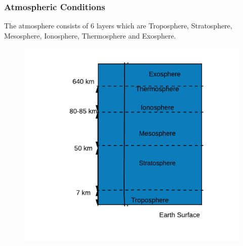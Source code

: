 \documentclass{fancyslides}
\begin{document}
\startingslide %


\begin{frame}
\end{frame}


\begin{frame}
   \frametitle{Atmospheric Conditions}
The atmosphere consists of 6 layers which are Troposphere, Stratosphere, Mesosphere, Ionosphere, Thermosphere and Exosphere. 
  	  \begin{figure}
\label{fig:Atmosphere}
  \centering
      \includegraphics[scale=0.2]{AtmosphereLayers.png}
\end{figure}
 \end{frame}
 
\end{document}
